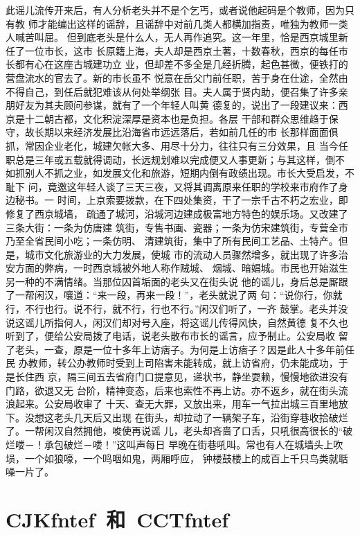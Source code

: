 \documentclass[cs4size,a4paper,fancyhdr,fntef,UTF8,winfonts]{ctexbook}
\begin{document}
此谣儿流传开来后，有人分析老头并不是个乞丐，或者说他起码是个教师，因为只有教
师才能编出这样的谣辞，且谣辞中对前几类人都横加指责，唯独为教师一类人喊苦叫屈。
但到底老头是什么人，无人再作追究。这一年里，恰是西京城里新任了一位市长，这市
长原籍上海，夫人却是西京土著，十数春秋，西京的每任市长都有心在这座古城建功立
业，但却差不多全是几经折腾，起色甚微，便铁打的营盘流水的官去了。新的市长虽不
悦意在岳父门前任职，苦于身在仕途，全然由不得自己，到任后就犯难该从何处举纲张
目。夫人属于贤内助，便召集了许多亲朋好友为其夫顾问参谋，就有了一个年轻人叫黄
德复的，说出了一段建议来：西京是十二朝古都，文化积淀深厚是资本也是负担。各层
干部和群众思维趋于保守，故长期以来经济发展比沿海省市远远落后，若如前几任的市
长那样面面俱抓，常因企业老化，城建欠帐大多、用尽十分力，往往只有三分效果，且
当今任职总是三年或五载就得调动，长远规划难以完成便又人事更新；与其这样，倒不
如抓别人不抓之业，如发展文化和旅游，短期内倒有政绩出现。市长大受启发，不耻下
问，竟邀这年轻人谈了三天三夜，又将其调离原来任职的学校来市府作了身边秘书。一
时间，上京索要拨款，在下四处集资，干了一宗千古不朽之宏业，即修复了西京城墙，
疏通了城河，沿城河边建成极富地方特色的娱乐场。又改建了三条大街：一条为仿唐建
筑街，专售书画、瓷器；一条为仿宋建筑街，专营全市乃至全省民间小吃；一条仿明、
清建筑街，集中了所有民间工艺品、土特产。但是，城市文化旅游业的大力发展，使城
市的流动人员骤然增多，就出现了许多治安方面的弊病，一时西京城被外地人称作贼城、
烟城、暗娼城。市民也开始滋生另一种的不满情绪。当那位囚首垢面的老头又在街头说
他的谣儿，身后总是厮跟了一帮闲汉，嚷道：“来一段，再来一段！”，老头就说了两
句：“说你行，你就行，不行也行。说不行，就不行，行也不行。”闲汉们听了，一齐
鼓掌。老头并没说这谣儿所指何人，闲汉们却对号入座，将这谣儿传得风快，自然黄德
复不久也听到了，便给公安局拨了电话，说老头散布市长的谣言，应予制止。公安局收
留了老头，一查，原是一位十多年上访痞子。为何是上访痞子？因是此人十多年前任民
办教师，转公办教师时受到上司陷害未能转成，就上访省府，仍未能成功，于是长住西
京，隔三间五去省府门口提意见，递状书，静坐耍赖，慢慢地欲进没有门路，欲退又无
台阶，精神变态，后来也索性不再上访。亦不返乡，就在街头流浪起来。公安局收审了
十天、查无大罪，又放出来，用车一气拉出城三百里地放下。没想这老头几天后又出现
在街头，却拉动了一辆架子车，沿街穿巷收拾破烂了。一帮闲汉自然拥他，唆使再说谣
儿，老头却吝啬了口舌，只吼很高很长的“破烂喽－！承包破烂－喽！”这叫声每日
早晚在街巷吼叫。常也有人在城墙头上吹埙，一个如狼嚎，一个鸣咽如鬼，两厢呼应，
钟楼鼓楼上的成百上千只鸟类就聒噪一片了。


\chapter{CJKfntef~和~CCTfntef}
\end{document}
